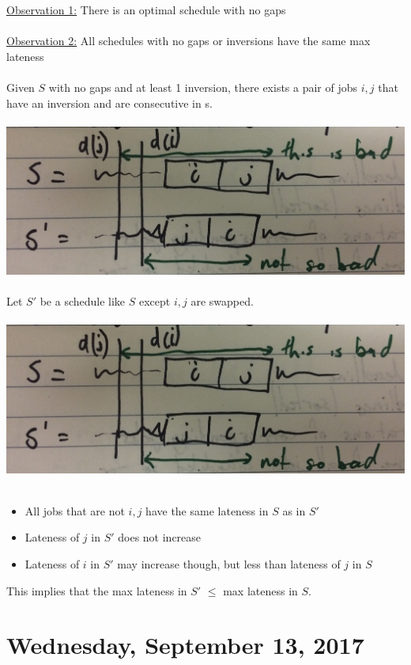 \documentclass[12pt]{article}
\begin{document}
\underline{Observation 1:} There is an optimal schedule with no gaps\\
\\
\underline{Observation 2:} All schedules with no gaps or inversions have the same max lateness\\
\\
Given $S$ with no gaps and at least 1 inversion, there exists a pair of jobs $i,j$ that have an inversion and are consecutive in s.\\
\\
\includegraphics[scale=0.11]{minmax4}
\\
\\
Let $S'$ be a schedule like $S$ except $i,j$ are swapped.\\
\\
\includegraphics[scale=0.11]{minmax4}
\\
\\
\begin{itemize}
	\item{All jobs that are not $i,j$ have the same lateness in $S$ as in $S'$}
	\item{Lateness of $j$ in $S'$ does not increase}
	\item{Lateness of $i$ in $S'$ may increase though, but less than lateness of $j$ in $S$}
\end{itemize}
This implies that the max lateness in $S'$ $\leq$ max lateness in $S$.

\newpage

\section{Wednesday, September 13, 2017}
\end{document}
